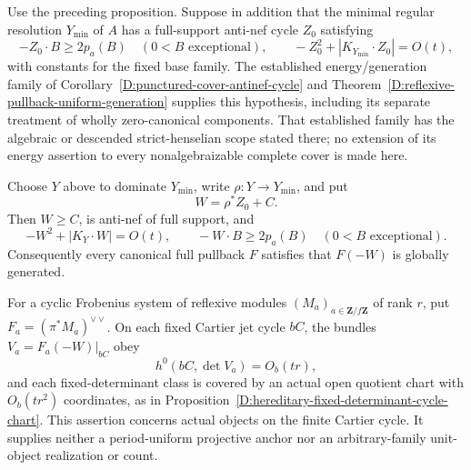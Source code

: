 \begin{proposition}
\label{D:hereditary-Cartier-generation-budget}
Use the preceding proposition. Suppose in addition that the minimal
regular resolution $Y_{\min}$ of $A$ has a full-support anti-nef
cycle $Z_0$ satisfying
\[
 -Z_0\cdot B\ge2p_a(B)\quad(0<B\text{ exceptional}),
 \qquad -Z_0^2+|K_{Y_{\min}}\cdot Z_0|=O(t),             \tag{D.HC.6}
\]
with constants for the fixed base family. The established
energy/generation family of
Corollary~\ref{D:punctured-cover-antinef-cycle} and
Theorem~\ref{D:reflexive-pullback-uniform-generation} supplies
this hypothesis, including its separate treatment of wholly
zero-canonical components. That established family has the
algebraic or descended strict-henselian scope stated there;
no extension of its energy assertion to every nonalgebraizable
complete cover is made here.

Choose $Y$ above to dominate $Y_{\min}$, write $\rho:Y\to Y_{\min}$,
and put
\[
                          W=\rho^*Z_0+C.
                                                        \tag{D.HC.7}
\]
Then $W\ge C$, is anti-nef of full support, and
\[
 -W^2+|K_Y\cdot W|=O(t),\qquad
                 -W\cdot B\ge2p_a(B)\quad(0<B\text{ exceptional}).
                                                        \tag{D.HC.8}
\]
Consequently every canonical full pullback $F$ satisfies that
$F(-W)$ is globally generated.

For a cyclic Frobenius system of reflexive modules
$(M_a)_{a\in\mathbf Z/f\mathbf Z}$ of rank $r$, put
$F_a=(\pi^*M_a)^{\vee\vee}$. On each fixed Cartier jet cycle
$bC$, the bundles $V_a=F_a(-W)|_{bC}$ obey
\[
 h^0(bC,\det V_a)=O_b(tr),
                                                        \tag{D.HC.9}
\]
and each fixed-determinant class is covered by an actual open
quotient chart with $O_b(tr^2)$ coordinates, as in
Proposition~\ref{D:hereditary-fixed-determinant-cycle-chart}.
This assertion concerns actual objects on the finite Cartier
cycle. It supplies neither a period-uniform projective anchor
nor an arbitrary-family unit-object realization or count.
\end{proposition}

